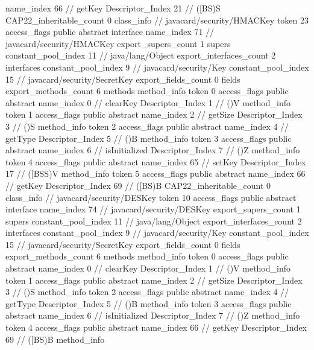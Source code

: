 {{{{{					name_index	66		// getKey
					Descriptor_Index	21		// ([BS)S
				}
			}
			CAP22_inheritable_count	0
		}
		class_info {		// javacard/security/HMACKey
			token	23
			access_flags	public abstract interface
			name_index	71		// javacard/security/HMACKey
			export_supers_count	1
			supers {
				constant_pool_index	11		// java/lang/Object
			}
			export_interfaces_count	2
			interfaces {
				constant_pool_index	9		// javacard/security/Key
				constant_pool_index	15		// javacard/security/SecretKey
			}
			export_fields_count	0
			fields {
			}
			export_methods_count	6
			methods {
				method_info {
					token	0
					access_flags	public abstract
					name_index	0		// clearKey
					Descriptor_Index	1		// ()V
				}
				method_info {
					token	1
					access_flags	public abstract
					name_index	2		// getSize
					Descriptor_Index	3		// ()S
				}
				method_info {
					token	2
					access_flags	public abstract
					name_index	4		// getType
					Descriptor_Index	5		// ()B
				}
				method_info {
					token	3
					access_flags	public abstract
					name_index	6		// isInitialized
					Descriptor_Index	7		// ()Z
				}
				method_info {
					token	4
					access_flags	public abstract
					name_index	65		// setKey
					Descriptor_Index	17		// ([BSS)V
				}
				method_info {
					token	5
					access_flags	public abstract
					name_index	66		// getKey
					Descriptor_Index	69		// ([BS)B
				}
			}
			CAP22_inheritable_count	0
		}
		class_info {		// javacard/security/DESKey
			token	10
			access_flags	public abstract interface
			name_index	74		// javacard/security/DESKey
			export_supers_count	1
			supers {
				constant_pool_index	11		// java/lang/Object
			}
			export_interfaces_count	2
			interfaces {
				constant_pool_index	9		// javacard/security/Key
				constant_pool_index	15		// javacard/security/SecretKey
			}
			export_fields_count	0
			fields {
			}
			export_methods_count	6
			methods {
				method_info {
					token	0
					access_flags	public abstract
					name_index	0		// clearKey
					Descriptor_Index	1		// ()V
				}
				method_info {
					token	1
					access_flags	public abstract
					name_index	2		// getSize
					Descriptor_Index	3		// ()S
				}
				method_info {
					token	2
					access_flags	public abstract
					name_index	4		// getType
					Descriptor_Index	5		// ()B
				}
				method_info {
					token	3
					access_flags	public abstract
					name_index	6		// isInitialized
					Descriptor_Index	7		// ()Z
				}
				method_info {
					token	4
					access_flags	public abstract
					name_index	66		// getKey
					Descriptor_Index	69		// ([BS)B
				}
				method_info {
}}}}}
